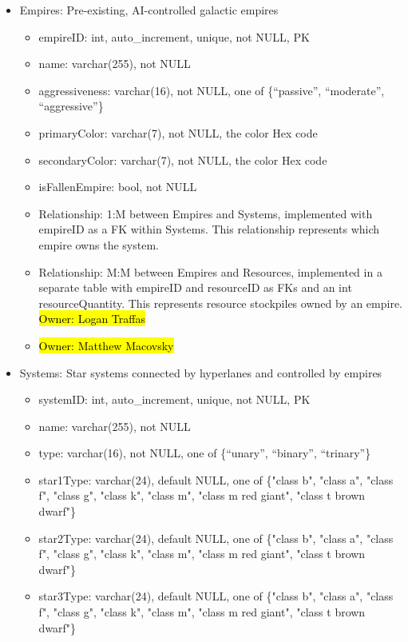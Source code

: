 \documentclass[12pt]{article}
\begin{document}
\begin{itemize}
    \item Empires: Pre-existing, AI-controlled galactic empires
    \begin{itemize}
        \item empireID: int, auto\_increment, unique, not NULL, PK
        \item name: varchar(255), not NULL
        \item aggressiveness: varchar(16), not NULL, one of \{“passive”, “moderate”, “aggressive”\}
        \item primaryColor: varchar(7), not NULL, the color Hex code
        \item secondaryColor: varchar(7), not NULL, the color Hex code
        \item isFallenEmpire: bool, not NULL
        \item Relationship: 1:M between Empires and Systems, implemented with empireID as a FK within Systems. This relationship represents which empire owns the system.
        \item Relationship: M:M between Empires and Resources, implemented in a separate table with empireID and resourceID as FKs and an int resourceQuantity. This represents resource stockpiles owned by an empire. \hl{Owner: Logan Traffas}
        \item \hl{Owner: Matthew Macovsky}
    \end{itemize}
    \item Systems: Star systems connected by hyperlanes and controlled by empires
    \begin{itemize}
        \item systemID: int, auto\_increment, unique, not NULL, PK
        \item name: varchar(255), not NULL
        \item type: varchar(16), not NULL, one of \{“unary”, “binary”, “trinary”\}
        \item star1Type: varchar(24), default NULL, one of \{"class b", "class a", "class f", "class g", "class k", "class m", "class m red giant", "class t brown dwarf"\}
        \item star2Type: varchar(24), default NULL, one of \{"class b", "class a", "class f", "class g", "class k", "class m", "class m red giant", "class t brown dwarf"\}
        \item star3Type: varchar(24), default NULL, one of \{"class b", "class a", "class f", "class g", "class k", "class m", "class m red giant", "class t brown dwarf"\}

\end{itemize}
\end{itemize}
\end{document}
